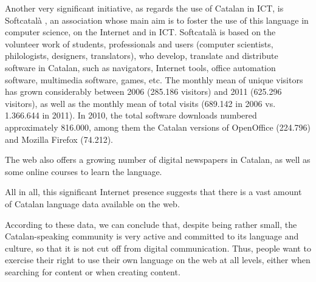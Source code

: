 \documentclass[]{../../metanetpaper}
\begin{document}
\begin{multicols}{2}
Another very significant initiative, as regards the use of Catalan in ICT, is Softcatalà \cite{CAT-Nota21}, an association whose main aim is to foster the use of this language in computer science, on the Internet and in ICT. Softcatalà is based on the volunteer work of students, professionals and users (computer scientists, philologists, designers, translators), who develop, translate and distribute software in Catalan, such as navigators, Internet tools, office automation software, multimedia software, games, etc. The monthly mean of unique visitors has grown considerably between 2006 (285.186 visitors) and 2011 (625.296 visitors), as well as the monthly mean of total visits (689.142 in 2006 vs. 1.366.644 in 2011). In 2010, the total software downloads numbered approximately 816.000, among them the Catalan versions of OpenOffice (224.796) and Mozilla Firefox (74.212).

The web also offers a growing number of digital newspapers in Catalan, as well as some online courses to learn the language. 

All in all, this significant Internet presence suggests that there is a vast amount of Catalan language data available on the web. 

According to these data, we can conclude that, despite being rather small, the Catalan-speaking community is very active and committed to its language and culture, so that it is not cut off from digital communication. Thus, people want to exercise their right to use their own language on the web at all levels, either when searching for content or when creating content. 
\end{multicols}

\clearpage


\end{document}

